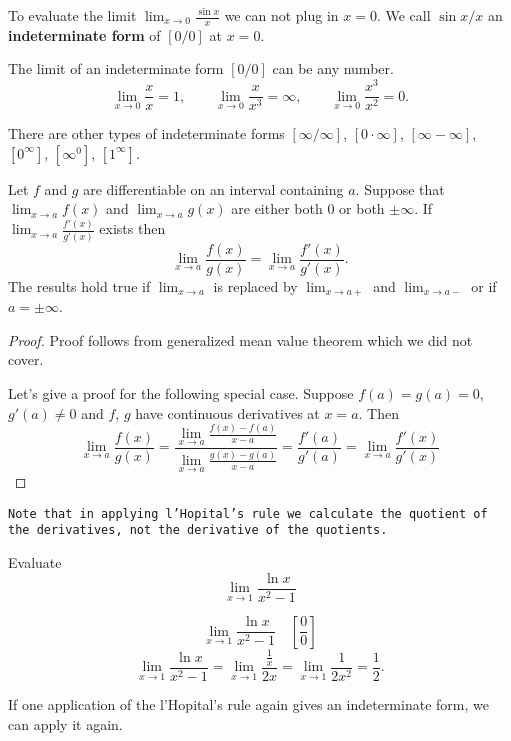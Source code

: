 \documentclass[../calc1-main.tex]{subfiles}
\begin{document}
To evaluate the limit $\lim_{x \to 0} \frac{\sin x}{x}$ we can not plug in $x=0$.
We call $\sin x/ x$ an \textbf{indeterminate form} of $[0/0]$ at $x=0$.

The limit of an indeterminate form $[0/0]$ can be any number.
\[
  \lim_{x \to 0} \frac{x}{x} = 1, \qquad
  \lim_{x \to 0} \frac{x}{x^3} = \infty, \qquad
  \lim_{x \to 0} \frac{x^3}{x^2} = 0.
\]

There are other types of indeterminate forms $[\infty/\infty]$, $[0 \cdot \infty]$, $[\infty - \infty]$, $[0^{\infty}]$, $[\infty^0]$, $[1^{\infty}]$.


\begin{theorem}
  Let $f$ and $g$ are differentiable on an interval containing $a$.
  Suppose that
  $\lim_{x \to a} f(x)$ and $\lim_{x \to a} g(x)$ are either both 0 or both $\pm \infty$. If $\lim_{x \to a} \frac{f'(x)}{g'(x)}$ exists then
  \[
    \lim_{x \to a} \frac{f(x)}{g(x)} = \lim_{x \to a} \frac{f'(x)}{g'(x)}.
  \]
  The results hold true if $\lim_{x \to a}$ is replaced by $\lim_{x \to a+}$ and $\lim_{x \to a-}$ or if $a= \pm \infty$.
\end{theorem}
\begin{proof}
  Proof follows from generalized mean value theorem which we did not cover.

  Let's give a proof for the following special case. Suppose $f(a) = g(a) = 0$, $g'(a) \neq 0$ and $f$, $g$ have continuous derivatives at $x=a$. Then
\[
  \lim_{x \to a} \frac{f(x)}{g(x)} = \frac{\lim_{x \to a} \frac{f(x)-f(a)}{x-a}}{\lim_{x \to a} \frac{g(x)-g(a)}{x-a}} = \frac{f'(a)}{g'(a)} = \lim_{x \to a} \frac{f'(x)}{g'(x)}
\]
\end{proof}

\texttt{Note that in applying l'Hopital's rule we calculate the quotient of the derivatives, not the derivative of the quotients.}

\begin{example}
  Evaluate
  \[
    \lim_{x \to 1} \frac{\ln x}{x^2-1}
  \]
\end{example}
\begin{solution}
  \[
    \lim_{x \to 1} \frac{\ln x}{x^2-1} \quad \left[ \frac{0}{0} \right]
  \]
  \[
    \lim_{x \to 1} \frac{\ln x}{x^2-1} =
    \lim_{x \to 1} \frac{\frac{1}{x}}{2x} =
    \lim_{x \to 1} \frac{1}{2x^2} = \frac{1}{2}.
  \]
\end{solution}

If one application of the l'Hopital's rule again gives an indeterminate form, we can apply it again.
\end{document}
